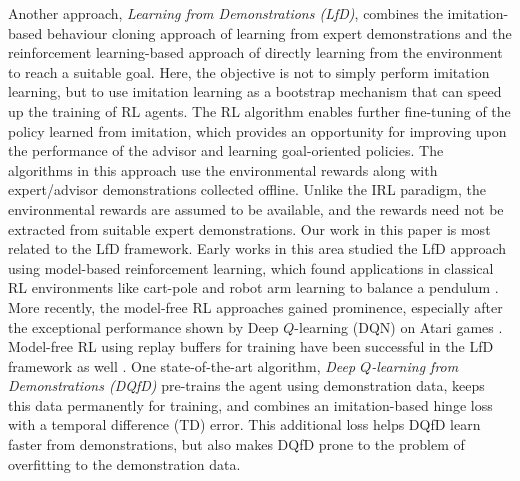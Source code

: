 \documentclass[jair, twoside,11pt,theapa]{article}
\begin{document}
Another approach, \textit{Learning from Demonstrations (LfD)}, combines the imitation-based behaviour cloning approach of learning from expert demonstrations and the reinforcement learning-based approach of directly learning from the environment to reach a suitable goal.  Here, the objective is not to simply perform imitation learning, but to use imitation learning as a bootstrap mechanism that can speed up the training of RL agents. The RL algorithm enables further fine-tuning of the policy learned from imitation, which provides an opportunity for improving upon the performance of the advisor and learning goal-oriented policies. 
The algorithms in this approach use the environmental rewards along with expert/advisor demonstrations collected offline. Unlike the IRL paradigm, the environmental rewards are assumed to be available, and the rewards need not be extracted from suitable expert demonstrations. Our work in this paper is most related to the LfD framework. Early works in this area studied the LfD approach using model-based reinforcement learning, which found applications in classical RL environments like cart-pole \citep{schaal1997learning} and robot arm learning to balance a pendulum \citep{atkeson1997robot}. More recently, the model-free RL approaches gained prominence, especially after the exceptional performance shown by Deep $Q$-learning (DQN) on Atari games \citep{mnih2015human}. Model-free RL using replay buffers for training have been successful in the LfD framework as well \citep{piot2014boosted, chemali2015direct}. One state-of-the-art algorithm, \textit{Deep $Q$-learning from Demonstrations (DQfD)} \citep{hester2018deep} pre-trains the agent using demonstration data, keeps this data permanently for training, and combines an imitation-based hinge loss with a temporal difference (TD) error. This additional loss helps DQfD learn faster from demonstrations, but also makes DQfD prone to the problem of overfitting to the demonstration data.  
\end{document}
